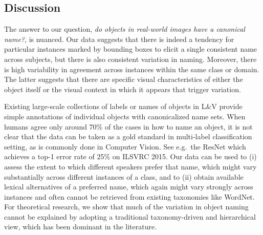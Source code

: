
\subsection{Discussion}
\label{subsec:discuss}


The answer to our question, \textit{do objects in real-world images have a canonical name?}, is nuanced.
Our data suggests that there is indeed a tendency for particular instances marked by bounding boxes to elicit a single consistent name across subjects, but there is also consistent variation in naming. Moreover, there is high variability in agreement across instances within the same class or domain.
The latter suggests that there are specific visual characteristics of either the object itself or the visual context in which it appears that trigger variation.

Existing large-scale collections of labels or names of objects in L\&V provide simple annotations of individual objects with canonicalized name sets.
When humans agree only around 70\% of the cases in how to name an object, it is not clear that the data can be taken as a gold standard in multi-label classification setting, as is commonly done in Computer Vision.
See e.g.\ the ResNet which achieves a top-1 error rate of 25\% on ILSVRC 2015. 
Our data can be used to (i) assess the extent to which different speakers prefer that name, which might vary substantially across different instances of a class, and to (ii) obtain available lexical alternatives of a preferred name, which again might vary strongly across instances and often cannot be retrieved from existing taxonomies like WordNet. 
For theoretical research, we show that much of the variation in object naming cannot be explained by adopting a traditional taxonomy-driven and hierarchical view, which has been dominant in the literature.

